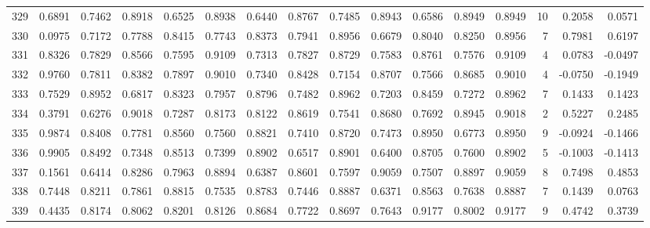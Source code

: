 \begin{tabular}{lrrrrrrrrrrrrrrr}
329 &      0.6891 &  0.7462 &  0.8918 &  0.6525 &  0.8938 &  0.6440 &  0.8767 &  0.7485 &  0.8943 &  0.6586 &   0.8949 &     0.8949 &     10 &                    0.2058 &                     0.0571 \\
330 &      0.0975 &  0.7172 &  0.7788 &  0.8415 &  0.7743 &  0.8373 &  0.7941 &  0.8956 &  0.6679 &  0.8040 &   0.8250 &     0.8956 &      7 &                    0.7981 &                     0.6197 \\
331 &      0.8326 &  0.7829 &  0.8566 &  0.7595 &  0.9109 &  0.7313 &  0.7827 &  0.8729 &  0.7583 &  0.8761 &   0.7576 &     0.9109 &      4 &                    0.0783 &                    -0.0497 \\
332 &      0.9760 &  0.7811 &  0.8382 &  0.7897 &  0.9010 &  0.7340 &  0.8428 &  0.7154 &  0.8707 &  0.7566 &   0.8685 &     0.9010 &      4 &                   -0.0750 &                    -0.1949 \\
333 &      0.7529 &  0.8952 &  0.6817 &  0.8323 &  0.7957 &  0.8796 &  0.7482 &  0.8962 &  0.7203 &  0.8459 &   0.7272 &     0.8962 &      7 &                    0.1433 &                     0.1423 \\
334 &      0.3791 &  0.6276 &  0.9018 &  0.7287 &  0.8173 &  0.8122 &  0.8619 &  0.7541 &  0.8680 &  0.7692 &   0.8945 &     0.9018 &      2 &                    0.5227 &                     0.2485 \\
335 &      0.9874 &  0.8408 &  0.7781 &  0.8560 &  0.7560 &  0.8821 &  0.7410 &  0.8720 &  0.7473 &  0.8950 &   0.6773 &     0.8950 &      9 &                   -0.0924 &                    -0.1466 \\
336 &      0.9905 &  0.8492 &  0.7348 &  0.8513 &  0.7399 &  0.8902 &  0.6517 &  0.8901 &  0.6400 &  0.8705 &   0.7600 &     0.8902 &      5 &                   -0.1003 &                    -0.1413 \\
337 &      0.1561 &  0.6414 &  0.8286 &  0.7963 &  0.8894 &  0.6387 &  0.8601 &  0.7597 &  0.9059 &  0.7507 &   0.8897 &     0.9059 &      8 &                    0.7498 &                     0.4853 \\
338 &      0.7448 &  0.8211 &  0.7861 &  0.8815 &  0.7535 &  0.8783 &  0.7446 &  0.8887 &  0.6371 &  0.8563 &   0.7638 &     0.8887 &      7 &                    0.1439 &                     0.0763 \\
339 &      0.4435 &  0.8174 &  0.8062 &  0.8201 &  0.8126 &  0.8684 &  0.7722 &  0.8697 &  0.7643 &  0.9177 &   0.8002 &     0.9177 &      9 &                    0.4742 &                     0.3739 \\

\end{tabular}
